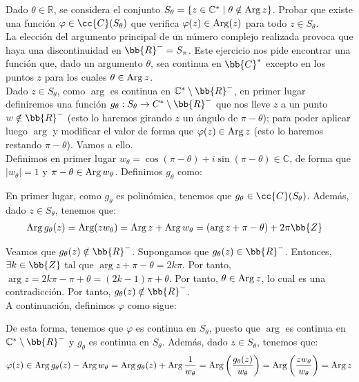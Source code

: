 \begin{ejercicio}\label{ej:2.2}
    Dado $\theta \in \mathbb{R}$, se considera el conjunto $S_\theta = \{z \in \mathbb{C}^\ast \mid \theta \notin \operatorname{Arg} z\}$. Probar que existe una función $\varphi \in \cc{C}(S_\theta)$ que verifica $\varphi(z) \in \operatorname{Arg} (z)$ para todo $z \in S_\theta$.\\

    La elección del argumento principal de un número complejo realizada provoca que haya una discontinuidad en $\bb{R}^-=S_{\pi}$. Este ejercicio nos pide encontrar una función que, dado un argumento $\theta$, sea continua en $\bb{C}^*$ excepto en los puntos $z$ para los cuales $\theta\in \operatorname{Arg} z$.\\

    Dado $z\in S_{\theta}$, como $\arg$ es continua en $\mathbb{C}^\ast\setminus \bb{R}^-$, en primer lugar definiremos una función $g_{\theta}:S_{\theta}\to C^{\ast}\setminus \bb{R}^-$ que nos lleve $z$ a un punto $w\notin \bb{R}^-$ (esto lo haremos girando $z$ un ángulo de $\pi-\theta$); para poder aplicar luego $\arg$ y modificar el valor de forma que $\varphi(z)\in \operatorname{Arg} z$ (esto lo haremos restando $\pi-\theta$). Vamos a ello.\\

    Definimos en primer lugar $w_\theta=\cos(\pi-\theta) + i\sin(\pi-\theta)\in \mathbb{C}$, de forma que $|w_\theta|=1$ y $\pi-\theta\in \operatorname{Arg} w_\theta$. Definimos $g_{\theta}$ como:

    En primer lugar, como $g_{\theta}$ es polinómica, tenemos que $g_\theta\in \cc{C}(S_{\theta})$. Además, dado $z\in S_{\theta}$, tenemos que:
    \begin{align*}
        \Arg g_{\theta}(z) &= \Arg(zw_\theta) = \Arg z + \Arg w_{\theta} = (\arg z + \pi-\theta)+2\pi\bb{Z}
    \end{align*}

    Veamos que $g_{\theta}(z)\notin \bb{R}^-$. Supongamos que $g_{\theta}(z)\in \bb{R}^-$. Entonces, $\exists k\in \bb{Z}$ tal que $\arg z + \pi-\theta = 2k\pi$. Por tanto, $\arg z = 2k\pi - \pi + \theta = (2k-1)\pi + \theta$. Por tanto, $\theta\in \operatorname{Arg} z$, lo cual es una contradicción. Por tanto, $g_{\theta}(z)\notin \bb{R}^-$.\\

    A continuación, definimos $\varphi$ como sigue:

    De esta forma, tenemos que $\varphi$ es continua en $S_{\theta}$, puesto que $\arg$ es continua en $\mathbb{C}^{\ast}\setminus \bb{R}^-$ y $g_{\theta}$ es continua en $S_{\theta}$. Además, dado $z\in S_{\theta}$, tenemos que:
    \begin{equation*}
        \varphi(z) \in \operatorname{Arg} g_{\theta}(z) - \operatorname{Arg} w_{\theta} = \operatorname{Arg} g_{\theta}(z) + \operatorname{Arg}\frac{1}{w_{\theta}} = \operatorname{Arg}\left(\frac{g_{\theta}(z)}{w_{\theta}}\right) = \operatorname{Arg}\left(\frac{zw_{\theta}}{w_{\theta}}\right) = \operatorname{Arg} z
    \end{equation*}
\end{ejercicio}

